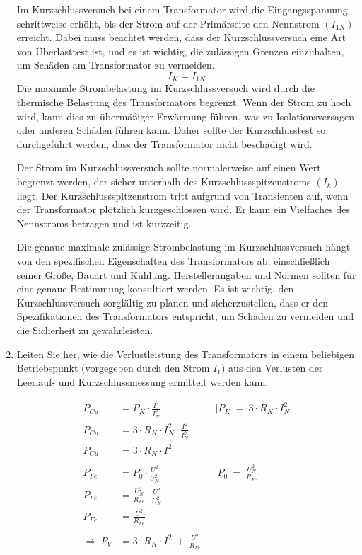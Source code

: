 \begin{enumerate}[label=\alph*)]
	      Im Kurzschlussversuch bei einem Transformator wird die Eingangsspannung
	      schrittweise erhöht, bis der Strom auf der Primärseite den Nennstrom $(I_{1N})$
	      erreicht. Dabei muss beachtet werden, dass der Kurzschlussversuch eine Art von
	      Überlasttest ist, und es ist wichtig, die zulässigen Grenzen einzuhalten, um
	      Schäden am Transformator zu vermeiden.
	      \[ I_K = I_{1N} \]
	      Die maximale Strombelastung im Kurzschlussversuch wird durch die thermische
	      Belastung des Transformators begrenzt. Wenn der Strom zu hoch wird, kann dies
	      zu übermäßiger Erwärmung führen, was zu Isolationsversagen oder anderen Schäden
	      führen kann. Daher sollte der Kurzschlusstest so durchgeführt werden, dass der
	      Transformator nicht beschädigt wird.

	      Der Strom im Kurzschlussversuch sollte normalerweise auf einen Wert begrenzt
	      werden, der sicher unterhalb des Kurzschlussspitzenstroms $(I_{k})$ liegt. Der
	      Kurzschlussspitzenstrom tritt aufgrund von Transienten auf, wenn der
	      Transformator plötzlich kurzgeschlossen wird. Er kann ein Vielfaches des
	      Nennstroms betragen und ist kurzzeitig.

	      Die genaue maximale zulässige Strombelastung im Kurzschlussversuch hängt von
	      den spezifischen Eigenschaften des Transformators ab, einschließlich seiner
	      Größe, Bauart und Kühlung. Herstellerangaben und Normen sollten für eine genaue
	      Bestimmung konsultiert werden. Es ist wichtig, den Kurzschlussversuch
	      sorgfältig zu planen und sicherzustellen, dass er den Spezifikationen des
	      Transformators entspricht, um Schäden zu vermeiden und die Sicherheit zu
	      gewährleisten.

	\item Leiten Sie her, wie die Verlustleistung des Transformators in einem beliebigen
	      Betriebspunkt (vorgegeben durch den Strom $I_1$) aus den Verlusten der
	      Leerlauf- und Kurzschlussmessung ermittelt werden kann.

	      \begin{align*}
		      P_{Cu}               & = P_K\cdot \frac{I^2}{I^2_N}\mspace{100mu} |P_K\ =\ 3\cdot R_K\cdot I^2_N \\
		      P_{Cu}               & = 3\cdot R_K\cdot I^2_N\cdot \frac{I^2}{I^2_N}                            \\
		      P_{Cu}               & = 3\cdot R_K\cdot I^2                                                     \\
		      \\
		      P_{Fe}               & = P_0\cdot \frac{U^2}{U^2_N}\mspace{100mu} |P_0\ =\ \frac{U^2_N}{R_{Fe}}  \\
		      P_{Fe}               & = \frac{U^2_N}{R_{Fe}}\cdot \frac{U^2}{U^2_N}                             \\
		      P_{Fe}               & = \frac{U^2}{R_{Fe}}                                                      \\
		      \\
		      \Longrightarrow\ P_V & = 3\cdot R_K\cdot I^2\ +\ \frac{U^2}{R_{Fe}}
	      \end{align*}


\end{enumerate}
